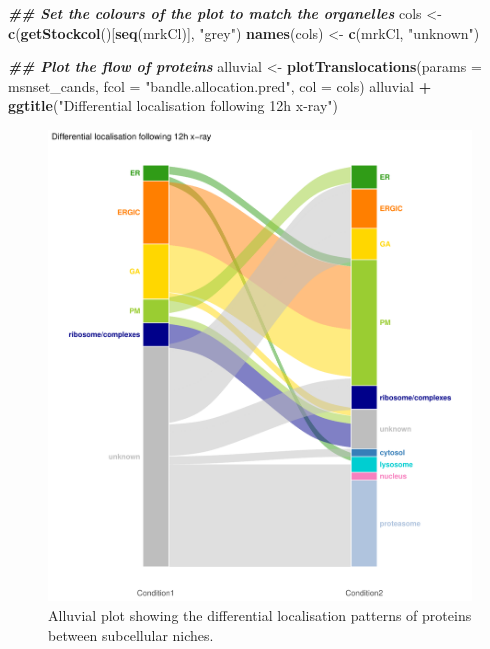 \documentclass[9pt,a4paper,]{extarticle}
\newenvironment{Shaded}{\begin{snugshade}}{\end{snugshade}}
\newcommand{\AttributeTok}[1]{\textcolor[rgb]{0.13,0.29,0.53}{#1}}
\newcommand{\DocumentationTok}[1]{\textcolor[rgb]{0.56,0.35,0.01}{\textbf{\textit{#1}}}}
\newcommand{\FunctionTok}[1]{\textcolor[rgb]{0.13,0.29,0.53}{\textbf{#1}}}
\newcommand{\NormalTok}[1]{#1}
\newcommand{\OtherTok}[1]{\textcolor[rgb]{0.56,0.35,0.01}{#1}}
\newcommand{\SpecialCharTok}[1]{\textcolor[rgb]{0.81,0.36,0.00}{\textbf{#1}}}
\newcommand{\StringTok}[1]{\textcolor[rgb]{0.31,0.60,0.02}{#1}}
\begin{document}
\begin{Shaded}
\begin{Highlighting}[]
\DocumentationTok{\#\# Set the colours of the plot to match the organelles}
\NormalTok{cols }\OtherTok{\textless{}{-}} \FunctionTok{c}\NormalTok{(}\FunctionTok{getStockcol}\NormalTok{()[}\FunctionTok{seq}\NormalTok{(mrkCl)], }\StringTok{"grey"}\NormalTok{)}
\FunctionTok{names}\NormalTok{(cols) }\OtherTok{\textless{}{-}} \FunctionTok{c}\NormalTok{(mrkCl, }\StringTok{"unknown"}\NormalTok{)}

\DocumentationTok{\#\# Plot the flow of proteins}
\NormalTok{alluvial }\OtherTok{\textless{}{-}} \FunctionTok{plotTranslocations}\NormalTok{(}\AttributeTok{params =}\NormalTok{ msnset\_cands, }
                               \AttributeTok{fcol =} \StringTok{"bandle.allocation.pred"}\NormalTok{, }
                               \AttributeTok{col =}\NormalTok{ cols)}
\NormalTok{alluvial }\SpecialCharTok{+} \FunctionTok{ggtitle}\NormalTok{(}\StringTok{"Differential localisation following 12h x{-}ray"}\NormalTok{)}
\end{Highlighting}
\end{Shaded}

\begin{figure}[H]

{\centering \includegraphics[width=0.7\linewidth,]{figs/alluvial_plot} 

}

\caption{Alluvial plot showing the differential localisation patterns of proteins between subcellular niches.}\label{fig:fig-alluvial}
\end{figure}
\end{document}
